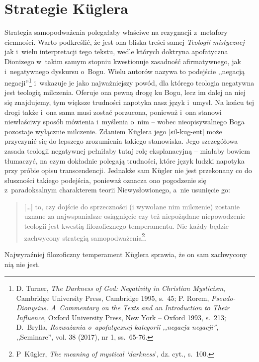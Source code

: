 \section{Strategie Küglera}

Strategia samopodważenia polegałaby właściwe na rezygnacji z~metafory ciemności. Warto podkreślić, że jest ona bliska treści samej \textit{Teologii mistycznej} jak i~wielu interpretacji tego tekstu, wedle których doktryna apofatyczna Dionizego w~takim samym stopniu kwestionuje zasadność afirmatywnego, jak i~negatywnego dyskursu o~Bogu. Wielu autorów nazywa to podejście ,,negacją negacji''\footnote{D. Turner, \textit{The Darkness of God: Negativity in Christian Mysticism}, Cambridge University Press, Cambridge 1995, s.~45; P. Rorem, \textit{Pseudo-Dionysius. A~Commentary on the Texts and an Introduction to Their Influence}, Oxford University Press, New York -- Oxford 1993, s.~213; D.~Brylla, \textit{Rozważania o~apofatycznej kategorii ,,negacja negacji''}, ,,Seminare'', vol. 38 (2017), nr 1, ss.~65-76.} i~wskazuje je jako najważniejszy powód, dla którego teologia negatywna jest teologią milczenia. Oferuje ona pewną drogę ku Bogu, lecz im dalej na niej się znajdujemy, tym większe trudności napotyka nasz język i~umysł. Na końcu tej drogi także i~ona sama musi zostać porzucona, ponieważ i~ona stanowi niewłaściwy sposób mówienia i~myślenia o~nim -- wobec nieopisywalnego Boga pozostaje wyłącznie milczenie. Zdaniem Küglera jego \ref{sil-kug-ent} może przyczynić się do lepszego zrozumienia takiego stanowiska. Jego szczegółowa zasada teologii negatywnej pełniłaby tutaj rolę eksplanacyjną -- miałaby bowiem tłumaczyć, na czym dokładnie polegają trudności, które język ludzki napotyka przy próbie opisu transcendencji. Jednakże sam Kügler nie jest przekonany co do słuszności takiego podejścia, ponieważ oznacza ono pogodzenie się z~paradoksalnym charakterem teorii Niewysłowionego, a~nie usunięcie go:

\begin{quote}
[\ldots] to, czy dojście do sprzeczności (i wywołane nim milczenie) zostanie uznane za najwspanialsze osiągnięcie czy też niepożądane niepowodzenie teologii jest kwestią filozoficznego temperamentu. Nie każdy będzie zachwycony strategią samopodważenia\footnote{P~Kügler, \textit{The meaning of mystical ‘darkness}', dz. cyt., s.~100.}.
\end{quote}
Najwyraźniej filozoficzny temperament Küglera sprawia, że on sam zachwycony nią nie jest.

